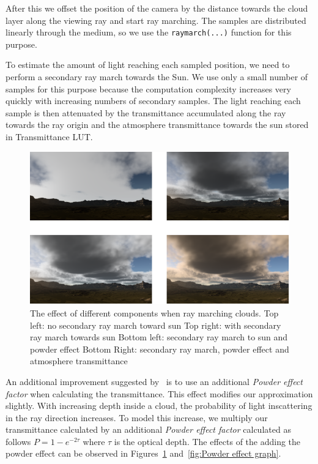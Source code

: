 \documentclass{ctuthesis}
\begin{document}
After this we offset the position of the camera by the distance towards the cloud layer along the
viewing ray and start ray marching. The samples are distributed linearly through the medium, so we use
the \verb|raymarch(...)| function for this purpose. 

To estimate the amount of light reaching each sampled position, we need to perform a secondary 
ray march towards the Sun. We use only a small number of samples for this purpose because the computation
complexity increases very quickly with increasing numbers of secondary samples. The light reaching
each sample is then attenuated by the transmittance accumulated along the ray towards the 
ray origin and the atmosphere transmittance towards the sun stored in Transmittance LUT.   

\begin{figure}
        \includegraphics[width=1.0\textwidth]{media/cloud_raymarch_effects.png}
        \caption[Raymarch component effects]{The effect of different components when ray marching clouds. Top left: no secondary ray march toward sun
        Top right: with secondary ray march towards sun Bottom left: secondary ray march to sun and powder
        effect Bottom Right: secondary ray march, powder effect and atmosphere transmittance}
        \label{fig:Cloud Raymarch effects}
\end{figure}

An additional improvement suggested by~\cite{schneider2015real} is to use an additional 
\textit{Powder effect factor} when calculating the transmittance. This effect modifies our 
approximation slightly. With increasing depth inside a cloud, the probability of light 
inscattering in the ray direction increases. To model this increase, we multiply our transmittance
calculated by an additional \textit{Powder effect factor} calculated as follows $P = 1 - e^{-2 \tau}$
where $\tau$ is the optical depth. The effects of the adding the powder effect can be observed in 
Figures~\ref{fig:Cloud Raymarch effects} and~\ref{fig:Powder effect graph}.
\end{document}
